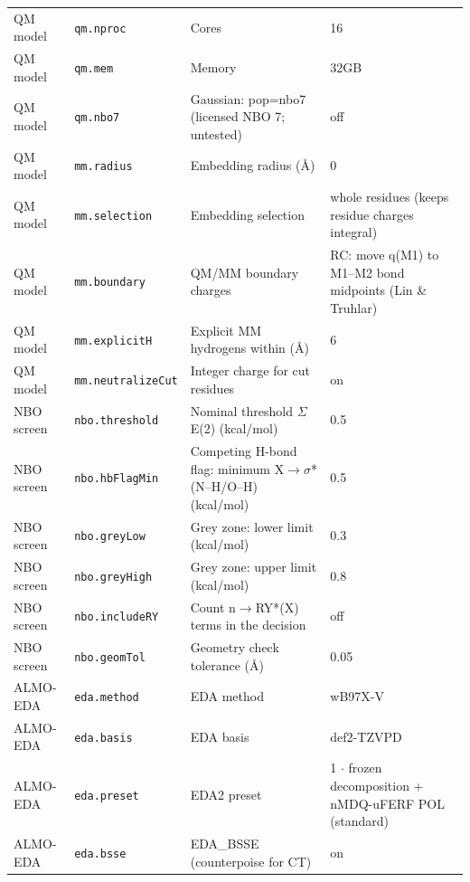 {\begin{longtable}{llp{4.2cm}l}
QM model & \texttt{qm.nproc} & Cores & \parbox[t]{5.0cm}{\raggedright 16}\\
QM model & \texttt{qm.mem} & Memory & \parbox[t]{5.0cm}{\raggedright 32GB}\\
QM model & \texttt{qm.nbo7} & Gaussian: pop=nbo7 (licensed NBO 7; untested) & \parbox[t]{5.0cm}{\raggedright off}\\
QM model & \texttt{mm.radius} & Embedding radius (\AA{}) & \parbox[t]{5.0cm}{\raggedright 0}\\
QM model & \texttt{mm.selection} & Embedding selection & \parbox[t]{5.0cm}{\raggedright whole residues (keeps residue charges integral)}\\
QM model & \texttt{mm.boundary} & QM/MM boundary charges & \parbox[t]{5.0cm}{\raggedright RC: move q(M1) to M1--M2 bond midpoints (Lin \& Truhlar)}\\
QM model & \texttt{mm.explicitH} & Explicit MM hydrogens within (\AA{}) & \parbox[t]{5.0cm}{\raggedright 6}\\
QM model & \texttt{mm.neutralizeCut} & Integer charge for cut residues & \parbox[t]{5.0cm}{\raggedright on}\\
NBO screen & \texttt{nbo.threshold} & Nominal threshold $\Sigma$E(2) (kcal/mol) & \parbox[t]{5.0cm}{\raggedright 0.5}\\
NBO screen & \texttt{nbo.hbFlagMin} & Competing H-bond flag: minimum X$\to\sigma$*(N--H/O--H) (kcal/mol) & \parbox[t]{5.0cm}{\raggedright 0.5}\\
NBO screen & \texttt{nbo.greyLow} & Grey zone: lower limit (kcal/mol) & \parbox[t]{5.0cm}{\raggedright 0.3}\\
NBO screen & \texttt{nbo.greyHigh} & Grey zone: upper limit (kcal/mol) & \parbox[t]{5.0cm}{\raggedright 0.8}\\
NBO screen & \texttt{nbo.includeRY} & Count n$\to$RY*(X) terms in the decision & \parbox[t]{5.0cm}{\raggedright off}\\
NBO screen & \texttt{nbo.geomTol} & Geometry check tolerance (\AA{}) & \parbox[t]{5.0cm}{\raggedright 0.05}\\
ALMO-EDA & \texttt{eda.method} & EDA method & \parbox[t]{5.0cm}{\raggedright wB97X-V}\\
ALMO-EDA & \texttt{eda.basis} & EDA basis & \parbox[t]{5.0cm}{\raggedright def2-TZVPD}\\
ALMO-EDA & \texttt{eda.preset} & EDA2 preset & \parbox[t]{5.0cm}{\raggedright 1 $\cdot$ frozen decomposition + nMDQ-uFERF POL (standard)}\\
ALMO-EDA & \texttt{eda.bsse} & EDA\_BSSE (counterpoise for CT) & \parbox[t]{5.0cm}{\raggedright on}\\

\end{longtable}}
